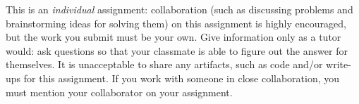 \documentclass[letterpaper,11pt]{article}
\begin{document}


This is an \emph{individual} assignment: collaboration (such as discussing problems and brainstorming ideas for solving them) on this assignment is highly encouraged, but the work you submit must be your own. Give information only as a tutor would: ask questions so that your classmate is able to figure out the answer for themselves. It is unacceptable to share any artifacts, such as code and/or write-ups for this assignment. If you work with someone in close collaboration, you must mention your collaborator on your assignment.
\end{document}

